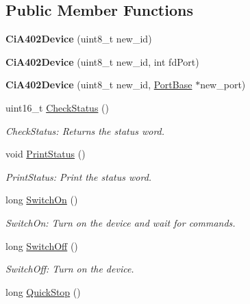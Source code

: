 \subsection*{Public Member Functions}
\begin{DoxyCompactItemize}
\item 
\mbox{\label{classCiA402Device_a77998e6d9ac4b75764612f3cab7426ef}} 
{\bfseries Ci\+A402\+Device} (uint8\+\_\+t new\+\_\+id)
\item 
\mbox{\label{classCiA402Device_a084b18ac995775f5079c8b260ec4c6c8}} 
{\bfseries Ci\+A402\+Device} (uint8\+\_\+t new\+\_\+id, int fd\+Port)
\item 
\mbox{\label{classCiA402Device_a017bcbc5d6e7a87b950b3cf2fcff1c41}} 
{\bfseries Ci\+A402\+Device} (uint8\+\_\+t new\+\_\+id, \hyperlink{classPortBase}{Port\+Base} $\ast$new\+\_\+port)
\item 
uint16\+\_\+t \hyperlink{classCiA402Device_a5a034b00c87d2ec9ec98157b772465d9}{Check\+Status} ()
\begin{DoxyCompactList}\small\item\em Check\+Status\+: Returns the status word. \end{DoxyCompactList}\item 
void \hyperlink{classCiA402Device_a9d5d8df28085395a3ab711107a181ebc}{Print\+Status} ()
\begin{DoxyCompactList}\small\item\em Print\+Status\+: Print the status word. \end{DoxyCompactList}\item 
long \hyperlink{classCiA402Device_ab77bce0d7f42429f5f8f092aacb02754}{Switch\+On} ()
\begin{DoxyCompactList}\small\item\em Switch\+On\+: Turn on the device and wait for commands. \end{DoxyCompactList}\item 
long \hyperlink{classCiA402Device_a97acf47b3e3751c85fa70091d3bdfa6a}{Switch\+Off} ()
\begin{DoxyCompactList}\small\item\em Switch\+Off\+: Turn on the device. \end{DoxyCompactList}\item 
long \hyperlink{classCiA402Device_a8573afbf420c29aa86cd215d74f4e4e3}{Quick\+Stop} ()

\end{DoxyCompactItemize}
